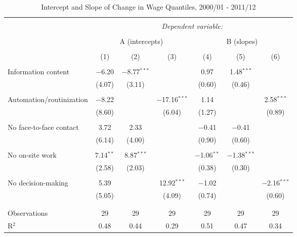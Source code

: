 

\begin{sidewaystable}[!htbp] \centering 
  \caption{Intercept and Slope of Change in Wage Quantiles, 2000/01 - 2011/12} 
  \label{tab:quantreg2} 
\begin{tabular}{@{\extracolsep{0pt}}lcccccc} 
\\[-1.8ex]\hline 
\hline \\[-1.8ex] 
 & \multicolumn{6}{c}{\textit{Dependent variable:}} \\ 
\cline{2-7} 
\\[-1.8ex] & \multicolumn{3}{c}{A (intercepts)} & \multicolumn{3}{c}{B (slopes)} \\ 
\\[-1.8ex] & (1) & (2) & (3) & (4) & (5) & (6)\\ 
\hline \\[-1.8ex] 
 Information content & $-$6.20 & $-$8.77$^{***}$ &  & 0.97 & 1.48$^{***}$ &  \\ 
  & (4.07) & (3.11) &  & (0.60) & (0.46) &  \\ 
  & & & & & & \\ 
 Automation/routinization & $-$8.22 &  & $-$17.16$^{***}$ & 1.14 &  & 2.58$^{***}$ \\ 
  & (8.60) &  & (6.04) & (1.27) &  & (0.89) \\ 
  & & & & & & \\ 
 No face-to-face contact & 3.72 & 2.33 &  & $-$0.41 & $-$0.41 &  \\ 
  & (6.14) & (4.00) &  & (0.90) & (0.60) &  \\ 
  & & & & & & \\ 
 No on-site work & 7.14$^{**}$ & 8.87$^{***}$ &  & $-$1.06$^{**}$ & $-$1.38$^{***}$ &  \\ 
  & (2.58) & (2.03) &  & (0.38) & (0.30) &  \\ 
  & & & & & & \\ 
 No decision-making & 5.39 &  & 12.92$^{***}$ & $-$1.02 &  & $-$2.16$^{***}$ \\ 
  & (5.05) &  & (4.09) & (0.74) &  & (0.60) \\ 
  & & & & & & \\ 
\hline \\[-1.8ex] 
Observations & 29 & 29 & 29 & 29 & 29 & 29 \\ 
R$^{2}$ & 0.48 & 0.44 & 0.29 & 0.51 & 0.47 & 0.34 \\ 

\end{tabular}
\end{sidewaystable}
